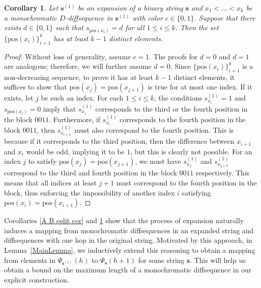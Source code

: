 \documentclass[11pt]{article}
\newtheorem{cor}{Corollary}
\begin{document}
\begin{cor}\label{pos bound cor}
   Let $\mathbf{s}^{(1)}$ be an expansion of a binary string $\mathbf{s}$ and $x_1<\dots<x_k$ be a monochromatic $D$-diffsequence in $\mathbf{s}^{(1)}$ with color $c\in\{0,1\}$. Suppose that there exists $d\in\{0,1\}$ such that $s_{\text{pos}(x_i)}=d$ for all $1\le i\le k$. Then the set $\{\text{pos}(x_i)\}^k_{i=1}$ has at least $k-1$ distinct elements.
\end{cor}
\begin{proof}
Without loss of generality, assume $c=1$. The proofs for $d=0$ and $d=1$ are analogous; therefore, we will further assume $ d=0$. Since $\{\text{pos}(x_i)\}^k_{i=1}$ is a non-decreasing sequence, to prove it has at least $k-1$ distinct elements, it suffices to show that $\text{pos}(x_j)=\text{pos}(x_{j+1})$ is true for at most one index. If it exists, let $j$ be such an index. For each $1\le i\le k$, the conditions $s^{(1)}_{x_i}=1$ and $s_{\text{pos}(x_i)}=0$ imply that $s^{(1)}_{x_i}$ corresponds to the third or the fourth position in the block $0011$. Furthermore, if $s^{(1)}_{x_i}$ corresponds to the fourth position in the block $0011$, then $s^{(1)}_{x_{i+1}}$ must also correspond to the fourth position. This is because if it corresponds to the third position, then the difference between $x_{i+1}$ and $x_i$ would be odd, implying it to be $1$, but this is clearly not possible. For an index $j$ to satisfy $\text{pos}(x_j)=\text{pos}(x_{j+1})$, we must have $s^{(1)}_{x_j}$ and $s^{(1)}_{x_{j+1}}$ correspond to the third and fourth position in the block $0011$ respectively. This means that all indices at least $j+1$ must correspond to the fourth position in the block, thus enforcing the impossibility of another index $i$ satisfying $\text{pos}(x_i)=\text{pos}(x_{i+1})$.
\end{proof}


Corollaries \ref{A B split cor} and \ref{pos bound cor} show that the process of expansion naturally induces a mapping from monochromatic diffsequences in an expanded string and diffsequences with one hop in the original string. Motivated by this approach, in Lemma~\ref{MainLemma}, we inductively extend this reasoning to obtain a mapping from elements in $\Psi_{\mathbf{s}^{(1)}}(h)$ to $\Psi_{\mathbf{s}}(h+1)$ for some string $\mathbf{s}$. This will help us obtain a bound on the maximum length of a monochromatic diffsequence in our explicit construction.
\end{document}
